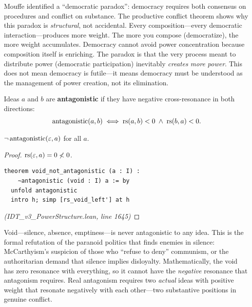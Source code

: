 \begin{interpretation}
Mouffe identified a ``democratic paradox'': democracy requires both consensus
on procedures and conflict on substance. The productive conflict theorem shows
why this paradox is \emph{structural}, not accidental. Every composition---every
democratic interaction---produces more weight. The more you compose
(democratize), the more weight accumulates. Democracy cannot avoid power
concentration because composition itself is enriching. The paradox is that the
very process meant to distribute power (democratic participation) inevitably
\emph{creates more power}. This does not mean democracy is futile---it means
democracy must be understood as the management of power creation, not its
elimination.
\end{interpretation}

\begin{definition}[Antagonism]
\label{def:antagonism}
Ideas $a$ and $b$ are \textbf{antagonistic} if they have negative
cross-resonance in both directions:
\[
  \mathrm{antagonistic}(a, b) \iff \mathrm{rs}(a, b) < 0 \;\land\; \mathrm{rs}(b, a) < 0.
\]
\end{definition}

\begin{theorem}
\label{thm:void-not-antagonistic}
$\neg\,\mathrm{antagonistic}(\varepsilon, a)$ for all $a$.
\end{theorem}

\begin{proof}
$\mathrm{rs}(\varepsilon, a) = 0 \not< 0$.
\begin{lstlisting}
theorem void_not_antagonistic (a : I) :
    ~antagonistic (void : I) a := by
  unfold antagonistic
  intro h; simp [rs_void_left'] at h
\end{lstlisting}
\textit{(IDT\_v3\_PowerStructure.lean, line 1645)}
\end{proof}

\begin{interpretation}
Void---silence, absence, emptiness---is never antagonistic to any idea. This is
the formal refutation of the paranoid politics that finds enemies in silence:
McCarthyism's suspicion of those who ``refuse to deny'' communism, or the
authoritarian demand that silence implies disloyalty. Mathematically,
the void has zero resonance with everything, so it cannot have the
\emph{negative} resonance that antagonism requires. Real antagonism requires
two \emph{actual} ideas with positive weight that resonate negatively with
each other---two substantive positions in genuine conflict.
\end{interpretation}

